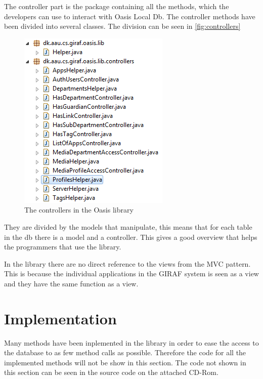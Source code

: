 The controller part is the package containing all the methods, which the developers can use to interact with Oasis Local Db.
The controller methods have been divided into several classes.
The division can be seen in \autoref{fig:controllers}
\begin{figure}
	\centering
		\includegraphics[width=\textwidth]{images/controllers.png}
	\caption{The controllers in the Oasis library}
	\label{fig:controllers}
\end{figure}

They are divided by the models that manipulate, this means that for each table in the db there is a model and a controller.
This gives a good overview that helps the programmers that use the library.

In the library there are no direct reference to the views from the MVC pattern.
This is because the individual applications in the GIRAF system is seen as a view and they have the same function as a view.

\section{Implementation}
\label{sec:LibImp}
Many methods have been inplemented in the library in order to ease the access to the database to as few method calls as possible.
Therefore the code for all the implemented methods will not be show in this section.
The code not shown in this section can be seen in the source code on the attached CD-Rom.


